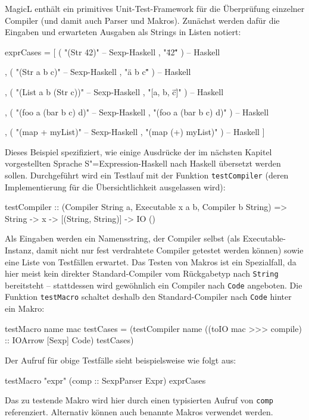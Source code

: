 \documentclass[12pt, a4paper, bibgerm]{scrbook}
\newenvironment{DIFnomarkup}{}{}
\newcommand\icode[1]{\lstinline?#1?}
\newcommand{\sexp}{S"=Expression}
\begin{document}
MagicL enthält ein primitives Unit-Test-Framework für die Überprüfung
einzelner Compiler (und damit auch Parser und Makros). Zunächst werden
dafür die Eingaben und erwarteten Ausgaben als Strings in Listen
notiert:
\begin{DIFnomarkup}\begin{code}
exprCases = [ ( "(Str 42)"                    -- Sexp-Haskell 
                , "\"42\"" )                  -- Haskell 

              , ( "(Str a  b c)"              -- Sexp-Haskell 
                , "\"a b c\"" )               -- Haskell 

              , ( "(List a b (Str c))"        -- Sexp-Haskell 
                , "[a, b, \"c\"]" )           -- Haskell 

              , ( "(foo a (bar b c) d)"       -- Sexp-Haskell 
                , "(foo a (bar b c) d)" )     -- Haskell 

              , ( "(map + myList)"            -- Sexp-Haskell 
                , "(map (+) myList)" )        -- Haskell 
              ]  
\end{code}\end{DIFnomarkup}
Dieses Beispiel spezifiziert, wie einige Ausdrücke der im nächsten
Kapitel vorgestellten Sprache \sexp{}-Haskell nach Haskell übersetzt
werden sollen. Durchgeführt wird ein Testlauf mit der Funktion
\icode{testCompiler} (deren Implementierung für die Übersichtlichkeit
ausgelassen wird):
\begin{DIFnomarkup}\begin{code} 
testCompiler :: 
  (Compiler String a, Executable x a b, Compiler b String) => 
  String -> x -> [(String, String)] -> IO ()
\end{code}\end{DIFnomarkup}
Als Eingaben werden ein Namensstring, der Compiler selbst (als
Executable-Instanz, damit nicht nur fest verdrahtete Compiler getestet
werden können) sowie eine Liste von Testfällen erwartet. Das Testen
von Makros ist ein Spezialfall, da hier meist kein direkter
Standard-Compiler vom Rückgabetyp nach \icode{String} bereitsteht --
stattdessen wird gewöhnlich ein Compiler nach \icode{Code}
angeboten. Die Funktion \icode{testMacro} schaltet deshalb den
Standard-Compiler nach \icode{Code} hinter ein
Makro:
\begin{DIFnomarkup}\begin{code}
testMacro name mac testCases = 
  (testCompiler name 
                ((toIO mac >>> compile) :: IOArrow [Sexp] Code)
                testCases)
\end{code}\end{DIFnomarkup}
Der Aufruf für obige Testfälle sieht beispielsweise wie folgt aus:
\begin{DIFnomarkup}\begin{code}
testMacro "expr" (comp :: SexpParser Expr) exprCases  
\end{code}\end{DIFnomarkup}
Das zu testende Makro wird hier durch einen typisierten Aufruf von
\icode{comp} referenziert. Alternativ können auch benannte Makros
verwendet werden.
\end{document}
